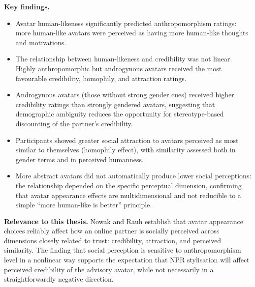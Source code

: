 \documentclass[11pt, a4paper]{article}
\begin{document}
\textbf{Key findings.}
\begin{itemize}[leftmargin=2em]
  \item Avatar human-likeness significantly predicted anthropomorphism ratings: more human-like avatars were perceived as having more human-like thoughts and motivations.
  \item The relationship between human-likeness and credibility was not linear. Highly anthropomorphic but androgynous avatars received the most favourable credibility, homophily, and attraction ratings.
  \item Androgynous avatars (those without strong gender cues) received higher credibility ratings than strongly gendered avatars, suggesting that demographic ambiguity reduces the opportunity for stereotype-based discounting of the partner's credibility.
  \item Participants showed greater social attraction to avatars perceived as most similar to themselves (homophily effect), with similarity assessed both in gender terms and in perceived humanness.
  \item More abstract avatars did not automatically produce lower social perceptions: the relationship depended on the specific perceptual dimension, confirming that avatar appearance effects are multidimensional and not reducible to a simple ``more human-like is better'' principle.
\end{itemize}

\textbf{Relevance to this thesis.} Nowak and Rauh establish that avatar appearance choices reliably affect how an online partner is socially perceived across dimensions closely related to trust: credibility, attraction, and perceived similarity. The finding that social perception is sensitive to anthropomorphism level in a nonlinear way supports the expectation that NPR stylisation will affect perceived credibility of the advisory avatar, while not necessarily in a straightforwardly negative direction.
\end{document}
